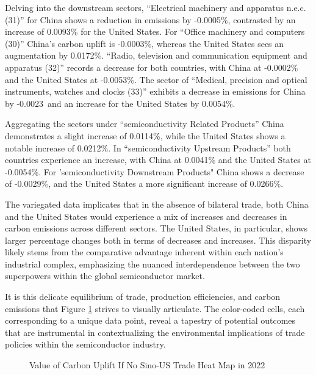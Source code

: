 Delving into the downstream sectors, ``Electrical machinery and apparatus n.e.c. (31)'' for China shows a reduction in emissions by -0.0005\%, contrasted by an increase of 0.0093\% for the United States. For ``Office machinery and computers (30)'' China's carbon uplift is -0.0003\%, whereas the United States sees an augmentation by 0.0172\%. ``Radio, television and communication equipment and apparatus (32)'' records a decrease for both countries, with China at -0.0002\% and the United States at -0.0053\%. The sector of ``Medical, precision and optical instruments, watches and clocks (33)'' exhibits a decrease in emissions for China by -0.0023\ and an increase for the United States by 0.0054\%.

Aggregating the sectors under ``semiconductivity Related Products'' China demonstrates a slight increase of 0.0114\%, while the United States shows a notable increase of 0.0212\%. In ``semiconductivity Upstream Products'' both countries experience an increase, with China at 0.0041\% and the United States at -0.0054\%. For 'semiconductivity Downstream Products" China shows a decrease of -0.0029\%, and the United States a more significant increase of 0.0266\%.

The variegated data implicates that in the absence of bilateral trade, both China and the United States would experience a mix of increases and decreases in carbon emissions across different sectors. The United States, in particular, shows larger percentage changes both in terms of decreases and increases. This disparity likely stems from the comparative advantage inherent within each nation's industrial complex, emphasizing the nuanced interdependence between the two superpowers within the global semiconductor market.

It is this delicate equilibrium of trade, production efficiencies, and carbon emissions that Figure \ref{fig:Value of Carbon Uplift If No Sino-US Trade Heatmap in 2022} strives to visually articulate. The color-coded cells, each corresponding to a unique data point, reveal a tapestry of potential outcomes that are instrumental in contextualizing the environmental implications of trade policies within the semiconductor industry.
\ifincludefigures 
\begin{figure}
 \centering
 \caption{Value of Carbon Uplift If No Sino-US Trade Heat Map in 2022}\label{fig:Value of Carbon Uplift If No Sino-US Trade Heatmap in 2022}
\end{figure}
\fi
